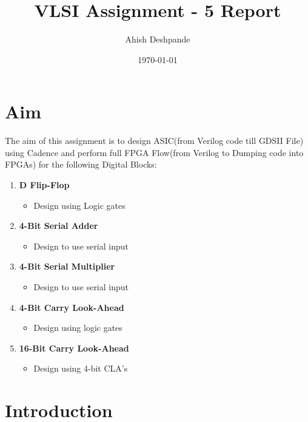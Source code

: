 \documentclass[a4paper,10pt]{report}
\begin{document}
\title{VLSI Assignment - 5 Report}
\author{Ahish Deshpande}
\date{\today}
\maketitle


\tableofcontents

\newpage

\renewcommand\thesection{\arabic{section}}
\section{Aim}

The aim of this assignment is to design ASIC(from Verilog code till GDSII File) using Cadence and perform full FPGA Flow(from Verilog to Dumping code into FPGAs) for the following Digital Blocks:
\begin{enumerate}

	\item \textbf{D Flip-Flop}
		\begin{itemize}
			\item Design using Logic gates
		\end{itemize}

	\item \textbf{4-Bit Serial Adder}
		\begin{itemize}
			\item Design to use serial input
		\end{itemize}

	\item \textbf{4-Bit Serial Multiplier}
		\begin{itemize}
			\item Design to use serial input 
		\end{itemize}

	\item \textbf{4-Bit Carry Look-Ahead}
		\begin{itemize}
			\item Design using logic gates
		\end{itemize}

	\item \textbf{16-Bit Carry Look-Ahead}
		\begin{itemize}
			\item Design using 4-bit CLA's
		\end{itemize}

\end{enumerate}

\section{Introduction}
\end{document}
